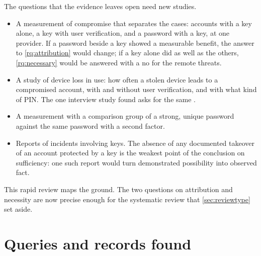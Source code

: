 The questions that the evidence leaves open need new studies.
\begin{itemize}
  \item A measurement of compromise that separates the cases: accounts
    with a key alone, a key with user verification, and a password with
    a key, at one provider.
    If a password beside a key showed a measurable benefit, the answer
    to \cref{rq:attribution} would change; if a key alone did as well as
    the others, \cref{rq:necessary} would be answered with a no for the
    remote threats.
  \item A study of device loss in use: how often a stolen device leads
    to a compromised account, with and without user verification, and
    with what kind of PIN.
    The one interview study found asks for the same
    \autocite{Bhardwaj2025PhoneTheft}.
  \item A measurement with a comparison group of a strong, unique
    password against the same password with a second factor.
  \item Reports of incidents involving keys.
    The absence of any documented takeover of an account protected by a
    key is the weakest point of the conclusion on sufficiency: one such
    report would turn demonstrated possibility into observed fact.
\end{itemize}
This rapid review maps the ground.
The two questions on attribution and necessity are now precise enough
for the systematic review that \cref{sec:reviewtype} set aside.


\printbibliography[section=0]


\appendix
{}

\section{Queries and records found}\label{sec:hitlists}

